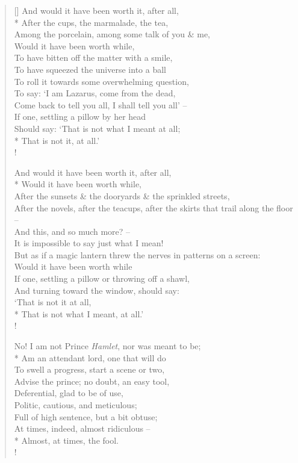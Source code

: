\documentclass[MAIN]{subfiles}
\begin{document}
\begin{verse}[\versewidth]
And would it have been worth it, after all,\\*
After the cups, the marmalade, the tea,\\
Among the porcelain, among some talk of you \& me,\\
Would it have been worth while,\\
To have bitten off the matter with a smile,\\
To have squeezed the universe into a ball\\
To roll it towards some overwhelming question,\\
To say: `I am Lazarus, come from the dead,\\
Come back to tell you all, I shall tell you all' --\\ 
If one, settling a pillow by her head\\
Should say: `That is not what I meant at all;\\*
That is not it, at all.'\\!

And would it have been worth it, after all,\\*
Would it have been worth while,\\
After the sunsets \& the dooryards \& the sprinkled streets,\\
After the novels, after the teacups, after the skirts that trail along the floor --\\
And this, and so much more? --\\
It is impossible to say just what I mean!\\
But as if a magic lantern threw the nerves in patterns on a screen:\\
Would it have been worth while\\
If one, settling a pillow or throwing off a shawl,\\
And turning toward the window, should say:\\
`That is not it at all,\\*
That is not what I meant, at all.'\\!

No! I am not Prince \emph{Hamlet}, nor was meant to be;\\* 
Am an attendant lord, one that will do\\
To swell a progress, start a scene or two,\\
Advise the prince; no doubt, an easy tool,\\
Deferential, glad to be of use,\\
Politic, cautious, and meticulous;\\
Full of high sentence, but a bit obtuse;\\
At times, indeed, almost ridiculous --\\*
Almost, at times, the fool.\\!


\end{verse}
\end{document}
